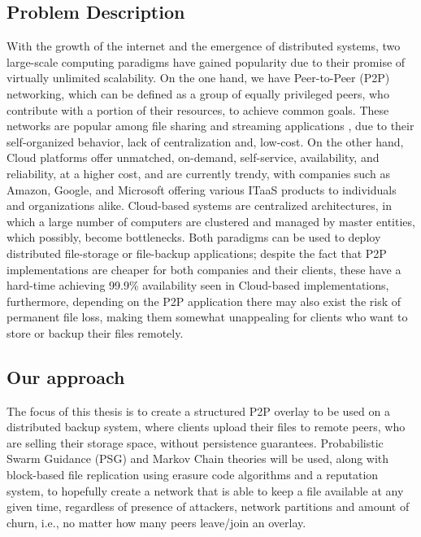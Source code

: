 \documentclass[runningheads]{llncs}
\begin{document}
\subsection{Problem Description}
With the growth of the internet and the emergence of distributed systems, two large-scale computing paradigms have gained popularity due to their promise of virtually unlimited scalability. On the one hand, we have Peer-to-Peer (P2P) networking, which can be defined as a group of equally privileged peers, who contribute with a portion of their resources, to achieve common goals. These networks are popular among file sharing and streaming applications \cite{ssaroiu:msp2pfss}, due to their self-organized behavior, lack of centralization and, low-cost. On the other hand, Cloud platforms offer unmatched, on-demand, self-service, availability, and reliability, at a higher cost, and are currently trendy, with companies such as Amazon, Google, and Microsoft offering various ITaaS products to individuals and organizations alike. Cloud-based systems are centralized architectures, in which a large number of computers are clustered and managed by master entities, which possibly, become bottlenecks. Both paradigms can be used to deploy distributed file-storage or file-backup applications; despite the fact that P2P implementations are cheaper for both companies and their clients, these have a hard-time achieving 99.9\% availability seen in Cloud-based implementations, furthermore, depending on the P2P application there may also exist the risk of permanent file loss, making them somewhat unappealing for clients who want to store or backup their files remotely.

\subsection{Our approach}
The focus of this thesis is to create a structured P2P overlay to be used on a distributed backup system, where clients upload their files to remote peers, who are selling their storage space, without persistence guarantees. Probabilistic Swarm Guidance (PSG) and Markov Chain theories will be used, along with block-based file replication using erasure code algorithms and a reputation system, to hopefully create a network that is able to keep a file available at any given time, regardless of presence of attackers, network partitions and amount of churn, i.e., no matter how many peers leave/join an overlay.
\end{document}
